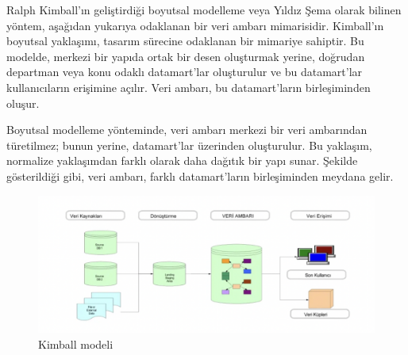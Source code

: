 \documentclass{article}
\begin{document}
Ralph Kimball’ın geliştirdiği boyutsal modelleme veya Yıldız Şema olarak bilinen yöntem, aşağıdan yukarıya odaklanan bir veri ambarı mimarisidir. Kimball’ın boyutsal yaklaşımı, tasarım sürecine odaklanan bir mimariye sahiptir. Bu modelde, merkezi bir yapıda ortak bir desen oluşturmak yerine, doğrudan departman veya konu odaklı datamart’lar oluşturulur ve bu datamart’lar kullanıcıların erişimine açılır. Veri ambarı, bu datamart’ların birleşiminden oluşur.

Boyutsal modelleme yönteminde, veri ambarı merkezi bir veri ambarından türetilmez; bunun yerine, datamart’lar üzerinden oluşturulur. Bu yaklaşım, normalize yaklaşımdan farklı olarak daha dağıtık bir yapı sunar. Şekilde gösterildiği gibi, veri ambarı, farklı datamart’ların birleşiminden meydana gelir.

 \begin{figure}[h]
\centering
  \includegraphics[width=13cm]{kimbal.png}
  \caption{Kimball modeli\cite{ref6}}
\end{figure}
\end{document}
